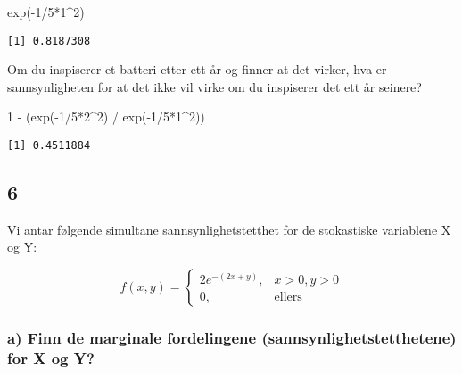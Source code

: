 \documentclass[
  12pt,
  a4paper,
  DIV=11,
  numbers=noendperiod]{scrartcl}
\newenvironment{Shaded}{\begin{snugshade}}{\end{snugshade}}
\newcommand{\DecValTok}[1]{\textcolor[rgb]{0.68,0.00,0.00}{#1}}
\newcommand{\FunctionTok}[1]{\textcolor[rgb]{0.28,0.35,0.67}{#1}}
\newcommand{\NormalTok}[1]{\textcolor[rgb]{0.00,0.23,0.31}{#1}}
\newcommand{\SpecialCharTok}[1]{\textcolor[rgb]{0.37,0.37,0.37}{#1}}
\begin{document}
\begin{Shaded}
\begin{Highlighting}[]
\FunctionTok{exp}\NormalTok{(}\SpecialCharTok{{-}}\DecValTok{1}\SpecialCharTok{/}\DecValTok{5}\SpecialCharTok{*}\DecValTok{1}\SpecialCharTok{\^{}}\DecValTok{2}\NormalTok{)}
\end{Highlighting}
\end{Shaded}

\begin{verbatim}
[1] 0.8187308
\end{verbatim}

Om du inspiserer et batteri etter ett år og finner at det virker, hva er
sannsynligheten for at det ikke vil virke om du inspiserer det ett år
seinere?

\begin{Shaded}
\begin{Highlighting}[]
\DecValTok{1} \SpecialCharTok{{-}}\NormalTok{ (}\FunctionTok{exp}\NormalTok{(}\SpecialCharTok{{-}}\DecValTok{1}\SpecialCharTok{/}\DecValTok{5}\SpecialCharTok{*}\DecValTok{2}\SpecialCharTok{\^{}}\DecValTok{2}\NormalTok{) }\SpecialCharTok{/} \FunctionTok{exp}\NormalTok{(}\SpecialCharTok{{-}}\DecValTok{1}\SpecialCharTok{/}\DecValTok{5}\SpecialCharTok{*}\DecValTok{1}\SpecialCharTok{\^{}}\DecValTok{2}\NormalTok{))}
\end{Highlighting}
\end{Shaded}

\begin{verbatim}
[1] 0.4511884
\end{verbatim}

\subsection{6}\label{section-1}

Vi antar følgende simultane sannsynlighetstetthet for de stokastiske
variablene X og Y:

\[
f(x,y) = 
\begin{cases} 
2e^{-(2x+y)}, & x > 0, y > 0 \\
0, & \text{ellers}
\end{cases}
\]

\subsubsection{a) Finn de marginale fordelingene
(sannsynlighetstetthetene) for X og
Y?}\label{a-finn-de-marginale-fordelingene-sannsynlighetstetthetene-for-x-og-y}
\end{document}
